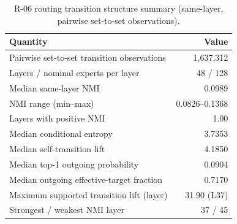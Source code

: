 \begin{table}[t]
\centering
\caption{R-06 routing transition structure summary (same-layer, pairwise set-to-set observations).}
\label{tab:r2-06-summary}
\small
\begin{tabular}{@{}lr@{}}
\toprule
Quantity & Value \\
\midrule
Pairwise set-to-set transition observations & 1,637,312 \\
Layers / nominal experts per layer & 48 / 128 \\
Median same-layer NMI & 0.0989 \\
NMI range (min--max) & 0.0826--0.1368 \\
Layers with positive NMI & 1.00 \\
Median conditional entropy & 3.7353 \\
Median self-transition lift & 4.1850 \\
Median top-1 outgoing probability & 0.0904 \\
Median outgoing effective-target fraction & 0.7170 \\
Maximum supported transition lift (layer) & 31.90 (L37) \\
Strongest / weakest NMI layer & 37 / 45 \\
\bottomrule
\end{tabular}
\end{table}

